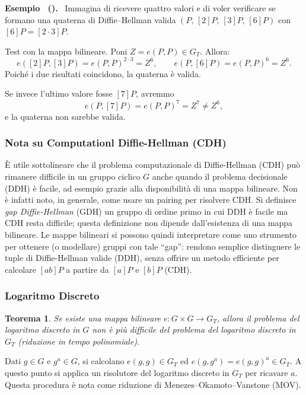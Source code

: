 \documentclass[a4paper, 11pt]{article}
\newenvironment{example}[1][]{
  \par\noindent\textbf{Esempio%
  \if\relax\detokenize{#1}\relax\else\ (\textbf{#1})\fi.}\ }{}
\newtheorem{theorem}{Teorema}
\begin{document}
\begin{example}
    Immagina di ricevere quattro valori e di voler verificare se formano una quaterna di Diffie–Hellman valida \((P,\,[2]P,\,[3]P,\,[6]P)\) con \([6]P=[2\cdot 3]P\).

    Test con la mappa bilineare. Poni \(Z=e(P,P)\in G_T\). Allora:
    \[
        e([2]P,[3]P)=e(P,P)^{2\cdot 3}=Z^{6},
        \qquad
        e(P,[6]P)=e(P,P)^{6}=Z^{6}.
    \]
    Poiché i due risultati coincidono, la quaterna è valida.

    Se invece l'ultimo valore fosse \([7]P\), avremmo
    \[
        e(P,[7]P)=e(P,P)^{7}=Z^{7}\neq Z^{6},
    \]
    e la quaterna non sarebbe valida.
\end{example}

\subsubsection*{Nota su Computationl Diffie-Hellman (CDH)}

È utile sottolineare che il problema computazionale di Diffie-Hellman (CDH) può rimanere difficile in un gruppo ciclico $G$ anche quando il problema decisionale (DDH) è facile, ad esempio grazie alla disponibilità di una mappa bilineare. Non è infatti noto, in generale, come usare un pairing per risolvere CDH. Si definisce \emph{gap Diffie-Hellman} (GDH) un gruppo di ordine primo in cui DDH è facile ma CDH resta difficile; questa definizione non dipende dall'esistenza di una mappa bilineare. Le mappe bilineari si possono quindi interpretare come uno strumento per ottenere (o modellare) gruppi con tale “gap”: rendono semplice distinguere le tuple di Diffie-Hellman valide (DDH), senza offrire un metodo efficiente per calcolare $[ab]P$ a partire da $[a]P$ e $[b]P$ (CDH).

\subsubsection*{Logaritmo Discreto}

\begin{theorem}
    Se esiste una mappa bilineare $e: G \times G \to G_T$, allora il problema del logaritmo discreto in $G$ non è più difficile del problema del logaritmo discreto in $G_T$ (riduzione in tempo polinomiale).
\end{theorem}

Dati $g\in G$ e $g^a\in G$, si calcolano $e(g,g)\in G_T$ ed $e(g,g^a)=e(g,g)^a\in G_T$. A questo punto si applica un risolutore del logaritmo discreto in $G_T$ per ricavare $a$. Questa procedura è nota come riduzione di Menezes--Okamoto--Vanstone (MOV).
\end{document}
